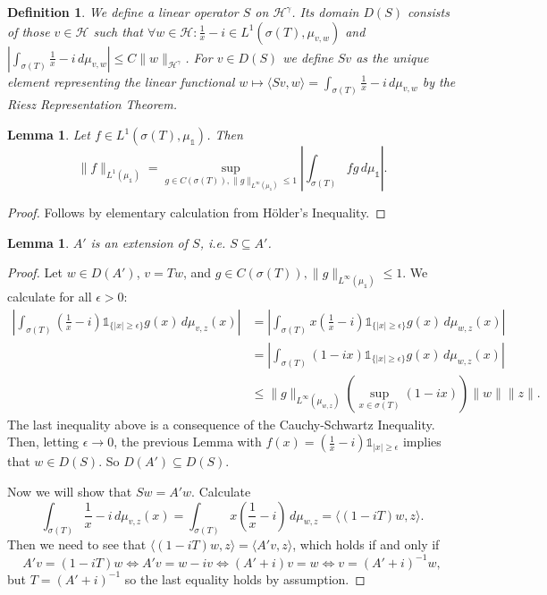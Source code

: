 \documentclass[12pt,oneside]{report}
\newtheorem{lem}[thm]{Lemma}
\newtheorem{defn}[thm]{Definition}
\begin{document}
\begin{defn}
    We define a linear operator $S$ on $\mathscr{H}^{\gamma}$. Its domain $D(S)$ consists of those $v \in \mathscr{H}$ such that $\forall w \in \mathscr{H}: \frac{1}{x} - i \in L^{1}(\sigma(T),\mu_{v,w})$ and $|\int _{\sigma(T)} \frac{1}{x} - i \, d\mu_{v,w}| \leq C\|w\|_{\mathscr{H}^{\gamma}}$. For $v \in D(S)$ we define $Sv$ as the unique element representing the linear functional $w \mapsto \langle Sv, w \rangle = \int _{\sigma(T)} \frac{1}{x} - i \, d\mu_{v,w}$ by the Riesz Representation Theorem.
\end{defn}

\begin{lem}
    Let $f \in L^{1}(\sigma(T), \mu_{\mathds{1}})$. Then
    $$\|f\|_{L^{1}(\mu_{\mathds{1}})} = \sup_{g \in C(\sigma(T)), \|g\|_{L^{\infty}(\mu_{\mathds{1}})}\leq 1} \left|\int _{\sigma(T)} fg \, d\mu_{\mathds{1}}\right|.$$
\end{lem}
\begin{proof}
    Follows by elementary calculation from Hölder's Inequality.
\end{proof}

\begin{lem}
    $A'$ is an extension of $S$, i.e. $S \subseteq A'$.
\end{lem}
\begin{proof}
    Let $w \in D(A')$, $v = Tw$, and $g \in C(\sigma(T)), \|g\|_{L^{\infty}(\mu_{\mathds{1}})} \leq 1$. We calculate for all $\epsilon > 0$:
    \begin{align*}
    \left| \int _{\sigma(T)} \left( \frac{1}{x} - i \right) \mathds{1}_{\{ |x| \geq \epsilon \}} g(x) \, d\mu_{v,z}(x) \right| &= \left| \int _{\sigma(T)} x \left( \frac{1}{x} - i \right) \mathds{1}_{\{ |x| \geq \epsilon \}} g(x) \, d\mu_{w,z}(x) \right| \\
    &= \left| \int _{\sigma(T)} ( 1 - ix ) \mathds{1}_{\{ |x| \geq \epsilon \}} g(x) \, d\mu_{w,z}(x) \right| \\
    &\leq \|g\|_{L^{\infty}(\mu_{w,z})} \left(\sup_{x \in \sigma(T)} (1 - ix)\right) \|w\| \|z\|.
    \end{align*}
    The last inequality above is a consequence of the Cauchy-Schwartz Inequality. Then, letting $\epsilon \to 0$, the previous Lemma with $f(x) = \left(\frac{1}{x} - i\right)\mathds{1}_{|x|\geq\epsilon}$ implies that $w \in D(S)$. So $D(A') \subseteq D(S)$.

    Now we will show that $Sw = A'w$. Calculate
    $$\int _{\sigma(T)} \frac{1}{x} - i \, d\mu_{v,z}(x) = \int _{\sigma(T)} x\left( \frac{1}{x} - i \right) \, d\mu_{w,z} = \langle (1 - iT)w, z \rangle.$$
    Then we need to see that $\langle (1 - iT)w, z \rangle = \langle A'v, z \rangle$, which holds if and only if $$A'v = (1 - iT)w \iff A'v = w - iv \iff (A'+i)v = w \iff v = (A'+i)^{-1}w,$$
    but $T = (A' + i)^{-1}$ so the last equality holds by assumption.
\end{proof}
\end{document}
